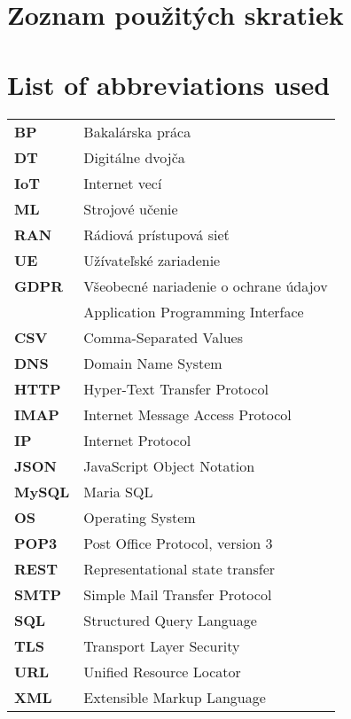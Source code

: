 \thispagestyle{plain}

\ifx\FIITlagEN\undefined
\section*{\Huge Zoznam použitých skratiek}
\else
\section*{\Huge List of abbreviations used}
\fi
\vskip 1cm

\begin{tabular}{ >{\bfseries}m{2cm} m{10cm} }
BP      & Bakalárska práca \\
DT      & Digitálne dvojča \\
IoT     & Internet vecí\\
ML      & Strojové učenie \\
RAN     & Rádiová prístupová sieť \\
UE      & Užívateľské zariadenie \\
GDPR    & Všeobecné nariadenie o ochrane údajov \\
\begin{comment}
API		& Application Programming Interface \\
CSV		& Comma-Separated Values \\
DNS		& Domain Name System \\
HTTP	& Hyper-Text Transfer Protocol \\
IMAP	& Internet Message Access Protocol \\
IP		& Internet Protocol \\
JSON	& JavaScript Object Notation \\
MySQL	& Maria SQL  \\
OS		& Operating System \\
POP3    & Post Office Protocol, version 3\\
REST    & Representational state transfer \\
SMTP	& Simple Mail Transfer Protocol \\
SQL		& Structured Query Language \\
TLS     & Transport Layer Security \\
URL		& Unified Resource Locator \\
XML		& Extensible Markup Language  
\end{comment}
\end{tabular}

\emptypage